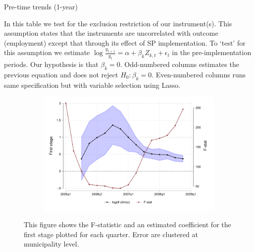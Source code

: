 \begin{table}[H]
\caption{Pre-time trends (1-year)}
\label{pretime_trends}
\begin{center}
\resizebox{0.75\textwidth}{!}{
\scriptsize{}
}
\end{center}
 \scriptsize 
 In this table we test for the exclusion restriction of our instrument(s). This assumption states that the instruments are uncorrelated with outcome (employment) except that through its effect of SP implementation. To `test' for this assumption we estimate 
 $\log{\frac{y_{t+1}}{y_t}} = \alpha + \beta_kZ_{k,t} + \epsilon_{t}$ 
 in the pre-implementation periods.  Our hypothesis is that $\beta_k=0$. Odd-numbered columns estimates the previous equation and does not reject $H_0 : \beta_k = 0$. Even-numbered columns runs same specification but with variable selection using Lasso.
 
\end{table}



\begin{figure}[H]
     \caption{First stage}
     \vspace{-.2in}
    \label{iv_fs}
\begin{center}
\begin{subfigure}{0.4\textwidth}
        \includegraphics[width=\textwidth]{Figuras/IV_FS.pdf}
    \end{subfigure}
  \end{center}
  \vspace{-.15in}
    \scriptsize 
   This figure shows the F-statistic and an estimated coefficient for the first stage plotted for each quarter. Error are clustered at municipality level.
    
\end{figure}



